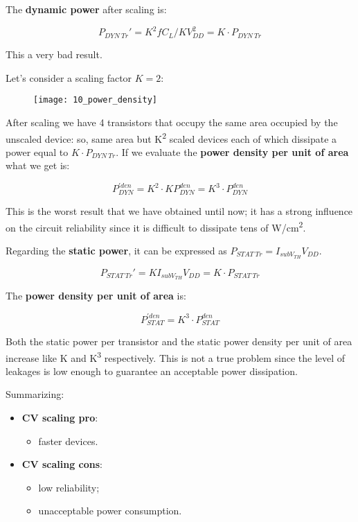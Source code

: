 \documentclass[a4paper, 12pt, twoside, openright]{report}
\newcommand{\super}{\textsuperscript}
\begin{document}
The \textbf{dynamic power} after scaling is:

	\begin{equation}
	P_{DYN \ Tr}' =  K^2 f C_L/K V_{DD}^2 = K \cdot P_{DYN \ Tr}
	\end{equation}

This a very bad result.

Let's consider a scaling factor $K = 2$:

	\begin{figure}[H]
	\centering
	\texttt{[image: 10\_power\_density]}
	\caption{}
	\label{}
	\end{figure}

After scaling we have 4 transistors that occupy the same area occupied by the unscaled device: so, same area but K\super{2} scaled devices each of which dissipate a power equal to $K \cdot P_{DYN \ Tr}$. If we evaluate the \textbf{power density per unit of area} what we get is:

	\begin{equation}
	P^{'den}_{DYN} = K^2 \cdot KP_{DYN}^{den} = K^3 \cdot P^{den}_{DYN}
	\end{equation}

This is the worst result that we have obtained until now; it has a strong influence on the circuit reliability since it is difficult to dissipate tens of W/cm\super{2}.

Regarding the \textbf{static power}, it can be expressed as $P_{STAT \ Tr} = I_{subV_{TH}} V_{DD}$.

	\begin{equation}
	P_{STAT \ Tr}' = K I_{subV_{TH}} V_{DD} = K \cdot P_{STAT \ Tr}
	\end{equation}

The \textbf{power density per unit of area} is:

	\begin{equation}
	P^{'den}_{STAT} = K^3 \cdot P^{den}_{STAT}
	\end{equation}

Both the static power per transistor and the static power density per unit of area increase like K and K\super{3} respectively. This is not a true problem since the level of leakages is low enough to guarantee an acceptable power dissipation.

Summarizing:

\begin{itemize}
\item \textbf{CV scaling pro}:
	
	\begin{itemize}
	\item faster devices.
	\end{itemize}

\item \textbf{CV scaling cons}:
	
	\begin{itemize}
	\item low reliability;
	\item unacceptable power consumption.
	\end{itemize}

\end{itemize}
\end{document}
